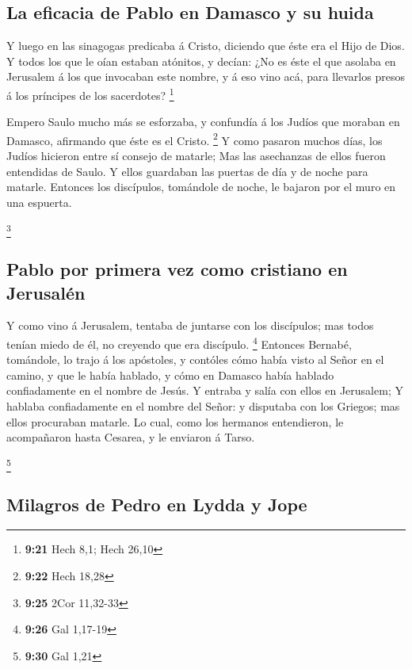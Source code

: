 \hypertarget{la-eficacia-de-pablo-en-damasco-y-su-huida}{%
\subsection{La eficacia de Pablo en Damasco y su
huida}\label{la-eficacia-de-pablo-en-damasco-y-su-huida}}

 Y luego en las sinagogas predicaba á Cristo, diciendo
que éste era el Hijo de Dios.  Y todos los que le oían
estaban atónitos, y decían: ¿No es éste el que asolaba en Jerusalem á
los que invocaban este nombre, y á eso vino acá, para llevarlos presos á
los príncipes de los sacerdotes? \footnote{\textbf{9:21} Hech 8,1; Hech
  26,10}

 Empero Saulo mucho más se esforzaba, y confundía á los
Judíos que moraban en Damasco, afirmando que éste es el Cristo.
\footnote{\textbf{9:22} Hech 18,28}  Y como pasaron
muchos días, los Judíos hicieron entre sí consejo de matarle;
 Mas las asechanzas de ellos fueron entendidas de Saulo.
Y ellos guardaban las puertas de día y de noche para matarle.
 Entonces los discípulos, tomándole de noche, le bajaron
por el muro en una espuerta.

\footnote{\textbf{9:25} 2Cor 11,32-33}

\hypertarget{pablo-por-primera-vez-como-cristiano-en-jerusaluxe9n}{%
\subsection{Pablo por primera vez como cristiano en
Jerusalén}\label{pablo-por-primera-vez-como-cristiano-en-jerusaluxe9n}}

 Y como vino á Jerusalem, tentaba de juntarse con los
discípulos; mas todos tenían miedo de él, no creyendo que era discípulo.
\footnote{\textbf{9:26} Gal 1,17-19}  Entonces Bernabé,
tomándole, lo trajo á los apóstoles, y contóles cómo había visto al
Señor en el camino, y que le había hablado, y cómo en Damasco había
hablado confiadamente en el nombre de Jesús.  Y entraba y
salía con ellos en Jerusalem;  Y hablaba confiadamente en
el nombre del Señor: y disputaba con los Griegos; mas ellos procuraban
matarle.  Lo cual, como los hermanos entendieron, le
acompañaron hasta Cesarea, y le enviaron á Tarso.

\footnote{\textbf{9:30} Gal 1,21}

\hypertarget{milagros-de-pedro-en-lydda-y-jope}{%
\subsection{Milagros de Pedro en Lydda y
Jope}\label{milagros-de-pedro-en-lydda-y-jope}}


